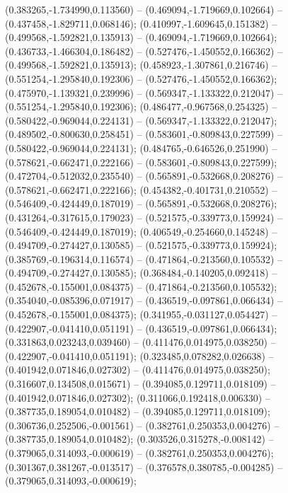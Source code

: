  (0.383265,-1.734990,0.113560) -- (0.469094,-1.719669,0.102664) -- (0.437458,-1.829711,0.068146);
 (0.410997,-1.609645,0.151382) -- (0.499568,-1.592821,0.135913) -- (0.469094,-1.719669,0.102664);
 (0.436733,-1.466304,0.186482) -- (0.527476,-1.450552,0.166362) -- (0.499568,-1.592821,0.135913);
 (0.458923,-1.307861,0.216746) -- (0.551254,-1.295840,0.192306) -- (0.527476,-1.450552,0.166362);
 (0.475970,-1.139321,0.239996) -- (0.569347,-1.133322,0.212047) -- (0.551254,-1.295840,0.192306);
 (0.486477,-0.967568,0.254325) -- (0.580422,-0.969044,0.224131) -- (0.569347,-1.133322,0.212047);
 (0.489502,-0.800630,0.258451) -- (0.583601,-0.809843,0.227599) -- (0.580422,-0.969044,0.224131);
 (0.484765,-0.646526,0.251990) -- (0.578621,-0.662471,0.222166) -- (0.583601,-0.809843,0.227599);
 (0.472704,-0.512032,0.235540) -- (0.565891,-0.532668,0.208276) -- (0.578621,-0.662471,0.222166);
 (0.454382,-0.401731,0.210552) -- (0.546409,-0.424449,0.187019) -- (0.565891,-0.532668,0.208276);
 (0.431264,-0.317615,0.179023) -- (0.521575,-0.339773,0.159924) -- (0.546409,-0.424449,0.187019);
 (0.406549,-0.254660,0.145248) -- (0.494709,-0.274427,0.130585) -- (0.521575,-0.339773,0.159924);
 (0.385769,-0.196314,0.116574) -- (0.471864,-0.213560,0.105532) -- (0.494709,-0.274427,0.130585);
 (0.368484,-0.140205,0.092418) -- (0.452678,-0.155001,0.084375) -- (0.471864,-0.213560,0.105532);
 (0.354040,-0.085396,0.071917) -- (0.436519,-0.097861,0.066434) -- (0.452678,-0.155001,0.084375);
 (0.341955,-0.031127,0.054427) -- (0.422907,-0.041410,0.051191) -- (0.436519,-0.097861,0.066434);
 (0.331863,0.023243,0.039460) -- (0.411476,0.014975,0.038250) -- (0.422907,-0.041410,0.051191);
 (0.323485,0.078282,0.026638) -- (0.401942,0.071846,0.027302) -- (0.411476,0.014975,0.038250);
 (0.316607,0.134508,0.015671) -- (0.394085,0.129711,0.018109) -- (0.401942,0.071846,0.027302);
 (0.311066,0.192418,0.006330) -- (0.387735,0.189054,0.010482) -- (0.394085,0.129711,0.018109);
 (0.306736,0.252506,-0.001561) -- (0.382761,0.250353,0.004276) -- (0.387735,0.189054,0.010482);
 (0.303526,0.315278,-0.008142) -- (0.379065,0.314093,-0.000619) -- (0.382761,0.250353,0.004276);
 (0.301367,0.381267,-0.013517) -- (0.376578,0.380785,-0.004285) -- (0.379065,0.314093,-0.000619);

